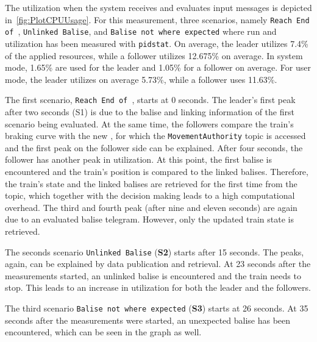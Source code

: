 The  utilization when the system receives and evaluates input messages is depicted in~\autoref{fig:PlotCPUUsage}.
For this measurement, three scenarios, namely \texttt{Reach End of }, \texttt{Unlinked Balise}, and \texttt{Balise not where expected} where run and  utilization has been measured with \texttt{pidstat}.
On average, the leader utilizes 7.4\% of the applied  resources, while a follower utilizes 12.675\% on average.
In system mode, 1.65\% are used for the leader and 1.05\% for a follower on average.
For user mode, the leader utilizes on average 5.73\%, while a follower uses 11.63\%.

The first scenario, \texttt{Reach End of }, starts at 0 seconds.
The leader's first peak after two seconds (S1) is due to the balise and linking information of the first scenario being evaluated.
At the same time, the followers compare the train's braking curve with the new , for which the \texttt{MovementAuthority} topic is accessed and the first peak on the follower side can be explained.
After four seconds, the follower has another peak in  utilization.
At this point, the first balise is encountered and the train's position is compared to the linked balises.
Therefore, the train's state and the linked balises are retrieved for the first time from the topic, which together with the decision making leads to a high computational overhead.
The third and fourth peak (after nine and eleven seconds) are again due to an evaluated balise telegram.
However, only the updated train state is retrieved.

The seconds scenario \texttt{Unlinked Balise} (\textbf{S2}) starts after 15 seconds.
The peaks, again, can be explained by data publication and retrieval.
At 23 seconds after the measurements started, an unlinked balise is encountered and the train needs to stop.
This leads to an increase in  utilization for both the leader and the followers.

The third scenario \texttt{Balise not where expected} (\textbf{S3}) starts at 26 seconds.
At 35 seconds after the measurements were started, an unexpected balise has been encountered, which can be seen in the graph as well.

